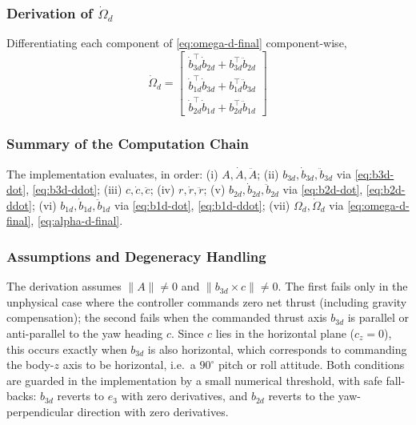 \documentclass[11pt]{article}
\theoremstyle{remark}
\begin{document}
\subsubsection{Derivation of $\dot\Omega_d$}
Differentiating each component of \eqref{eq:omega-d-final} component-wise,
\begin{equation}
\boxed{\quad\dot\Omega_d =
\begin{bmatrix}
\dot b_{3d}^\top\dot b_{2d} + b_{3d}^\top\ddot b_{2d}\\
\dot b_{1d}^\top\dot b_{3d} + b_{1d}^\top\ddot b_{3d}\\
\dot b_{2d}^\top\dot b_{1d} + b_{2d}^\top\ddot b_{1d}
\end{bmatrix}\quad}
\label{eq:alpha-d-final}
\end{equation}

\subsubsection{Summary of the Computation Chain}
The implementation evaluates, in order: (i) $A, \dot A, \ddot A$; (ii) $b_{3d}, \dot b_{3d}, \ddot b_{3d}$ via \eqref{eq:b3d-dot}, \eqref{eq:b3d-ddot}; (iii) $c, \dot c, \ddot c$; (iv) $r, \dot r, \ddot r$; (v) $b_{2d}, \dot b_{2d}, \ddot b_{2d}$ via \eqref{eq:b2d-dot}, \eqref{eq:b2d-ddot}; (vi) $b_{1d}, \dot b_{1d}, \ddot b_{1d}$ via \eqref{eq:b1d-dot}, \eqref{eq:b1d-ddot}; (vii) $\Omega_d, \dot\Omega_d$ via \eqref{eq:omega-d-final}, \eqref{eq:alpha-d-final}.

\subsubsection{Assumptions and Degeneracy Handling}
The derivation assumes $\|A\| \neq 0$ and $\|b_{3d}\times c\| \neq 0$. The first fails only in the unphysical case where the controller commands zero net thrust (including gravity compensation); the second fails when the commanded thrust axis $b_{3d}$ is parallel or anti-parallel to the yaw heading $c$. Since $c$ lies in the horizontal plane ($c_z = 0$), this occurs exactly when $b_{3d}$ is also horizontal, which corresponds to commanding the body-$z$ axis to be horizontal, i.e.\ a $90^\circ$ pitch or roll attitude. Both conditions are guarded in the implementation by a small numerical threshold, with safe fall-backs: $b_{3d}$ reverts to $e_3$ with zero derivatives, and $b_{2d}$ reverts to the yaw-perpendicular direction with zero derivatives.
\end{document}
